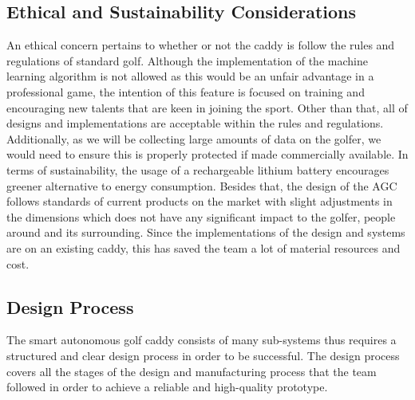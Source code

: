 \documentclass[11pt,landscape]{article}
\begin{document}
\begin{multicols}{3}
\subsection{Ethical and Sustainability Considerations}
An ethical concern pertains to whether or not the caddy is follow the rules and
regulations of standard golf. Although the implementation of the machine
learning algorithm is not allowed as this would be an unfair advantage in a
professional game, the intention of this feature is focused on training and
encouraging new talents that are keen in joining the sport. Other than that, all
of designs and implementations are acceptable within the rules and regulations.
Additionally, as we will be collecting large amounts of data on the golfer, we
would need to ensure this is properly protected if made commercially available.
In terms of sustainability, the usage of a rechargeable lithium battery
encourages greener alternative to energy consumption. Besides that, the design
of the AGC follows standards of current products on the market with slight
adjustments in the dimensions which does not have any significant impact to the
golfer, people around and its surrounding. Since the implementations of the
design and systems are on an existing caddy, this has saved the team a lot of
material resources and cost.  

\subsection{Design Process}
The smart autonomous golf caddy consists of many sub-systems thus requires a
structured and clear design process in order to be successful. The design
process covers all the stages of the design and manufacturing process that the
team followed in order to achieve a reliable and high-quality prototype.


\end{multicols}
\end{document}
